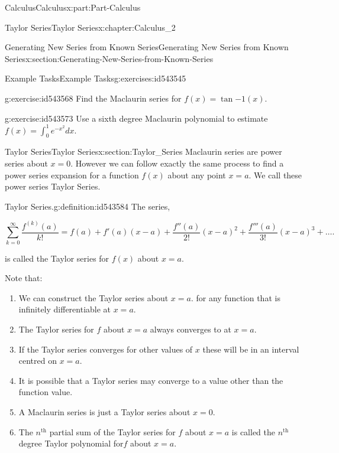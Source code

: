 \documentclass[oneside,10pt,]{book}
\numberwithin{equation}{section}
\begin{document}
\begin{partptx}{Calculus}{}{Calculus}{}{}{x:part:Part-Calculus}
\begin{chapterptx}{Taylor Series}{}{Taylor Series}{}{}{x:chapter:Calculus_2}
\begin{sectionptx}{Generating New Series from Known Series}{}{Generating New Series from Known Series}{}{}{x:section:Generating-New-Series-from-Known-Series}
\begin{exercises-subsection-numberless}{Example Tasks}{}{Example Tasks}{}{}{g:exercises:id543545}
\begin{divisionexercise}{4}{}{}{g:exercise:id543568}
Find the Maclaurin series for \(f(x)=\tan{-1}(x). \)%
\end{divisionexercise}%
\begin{divisionexercise}{5}{}{}{g:exercise:id543573}%
Use a sixth degree Maclaurin polynomial to estimate  \(f(x)=\int_{0}^{1}e^{-x^{2}}dx. \)%
\end{divisionexercise}%
\end{exercises-subsection-numberless}
\end{sectionptx}
%
%
\typeout{************************************************}
\typeout{************************************************}
%
\begin{sectionptx}{Taylor Series}{}{Taylor Series}{}{}{x:section:Taylor_Series}
Maclaurin series are power series about \(x=0. \)  However we can follow exactly the same process to find a power series expansion for a function   \(f(x) \) about any point   \(x=a. \)  We call these power series Taylor Series.%
\begin{definition}{Taylor Series.}{g:definition:id543584}%
The series,%
\par
%
\begin{equation*}
\sum_{k=0}^{\infty}\dfrac{f^{(k)}(a)}{k!}=f(a)+f'(a)(x-a)+\dfrac{f''(a)}{2!}(x-a)^{2}+\dfrac{f'''(a)}{3!}(x-a)^3+ \dots \text{.}
\end{equation*}
%
\par
is called the Taylor series for \(f(x) \) about   \(x=a. \)%
\end{definition}
Note that:%
\par
%
\begin{enumerate}
\item{}We can construct the Taylor series about  \(x=a.  \)  for any function that is infinitely differentiable at  \(x=a.  \)%
\item{}The Taylor series for \(f \) about  \(x=a \)    always converges to  at  \(x=a. \)%
\item{}If the Taylor series converges for other values of \(x \) these will be in an interval centred on \(x=a. \)%
\item{}It is possible that a Taylor series may converge to a value other than the function value.%
\item{}A Maclaurin series is just a Taylor series about  \(x=0.  \)%
\item{}The \(n^{\text{th}} \)  partial sum of the Taylor series for \(f \) about \(x=a \)  is called the \(n^{\text{th}} \) degree Taylor polynomial for\(f \) about  \(x=a. \)%

\end{enumerate}
\end{sectionptx}
\end{chapterptx}
\end{partptx}
\end{document}
